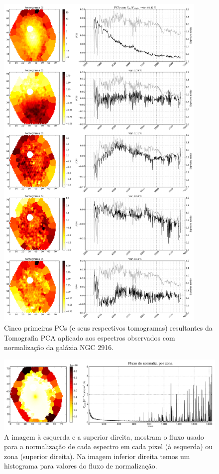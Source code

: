 \begin{figure}
    \includegraphics[width=0.9\textwidth]{figuras/K0277-tomo-obs-norm.pdf}
    \caption[Tomogramas de 1 a 5 da gal\'axia NGC 2916 - $F_{obs}$ norm.]
    {Cinco primeiras PCs (e seus respectivos tomogramas) resultantes da Tomografia PCA aplicado aos espectros
    observados com normalização da galáxia NGC 2916.}
    \label{fig:cap4:K277tomofobsnorm}
\end{figure}

\begin{figure}
    \includegraphics[width=1.\textwidth]{figuras/K0277-fobs_norm.pdf}
    \caption[Fluxos de normalização para cada zona da galáxia K0277.]
    {A imagem à esquerda e a superior direita, mostram o fluxo usado para a normalização de cada espectro em
    cada pixel (à esquerda) ou zona (superior direita). Na imagem inferior direita temos um histograma para valores do
    fluxo de normalização.}
    \label{fig:cap4:K277fobsnorm}
\end{figure}

